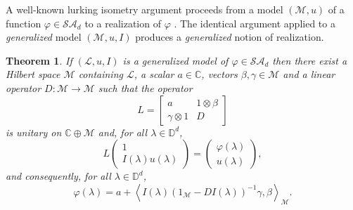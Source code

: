 \documentclass[11pt, reqno]{amsart}
\newtheorem{theorem}{Theorem}[section]
\newcommand\1{\boldsymbol {1}}
\newcommand{\sad}{\mathcal{SA}_d}
\renewcommand{\L}{\mathcal{L}}
\newcommand{\M}{\mathcal{M}}
\newcommand{\D}{\mathbb{D}}
\newcommand{\C}{\mathbb{C}}
\newcommand{\ip}[2]{\left\langle #1, #2 \right\rangle}
\newcommand{\vp}{\varphi}
\newcommand{\ph}{\varphi}
\newcommand\ga{\gamma}
\newcommand\la{\lambda}
\newcommand\beq{\begin{equation}}
\newcommand\eeq{\end{equation}}
\newcommand{\vectwo}[2]
{
   \begin{pmatrix} #1 \\ #2 \end{pmatrix}
}
\numberwithin{equation}{section}
\begin{document}
A well-known lurking isometry argument proceeds from a model $(\M,u)$ of a function $\ph\in \sad$ to a realization of $\ph$ \cite{Ag1}. The identical argument applied to a {\em generalized} model $(\M, u, I)$ produces a {\em generalized} notion of realization.
\begin{theorem} \label{genRealiz}
 If $(\L, u, I)$ is a generalized model of $\vp \in \sad$ then there exist a Hilbert space $\M$ containing $\L$, a scalar $a \in \C$, vectors $\beta, \gamma \in \M$ and a linear operator $D:\M \to \M$ such that the operator
\beq \label{defL}
L =  \begin{bmatrix}
  a & 1 \otimes \beta \\
  \gamma \otimes 1 & D
 \end{bmatrix}
\eeq
is unitary on $\C \oplus \M$ and, for all $\lambda \in \D^d$, 
\beq\label{Leq}
 L \vectwo{1}{I(\lambda)u(\lambda)} = \vectwo{\vp(\lambda)}{u(\lambda)},
\eeq
and consequently, for all $\la\in\D^d$,
\beq\label{formphi}
\ph(\la) = a+ \ip{I(\la)(1_{\M}-DI(\la))^{-1}\ga}{\beta}_{\M}.
\eeq
\end{theorem}
\end{document}
